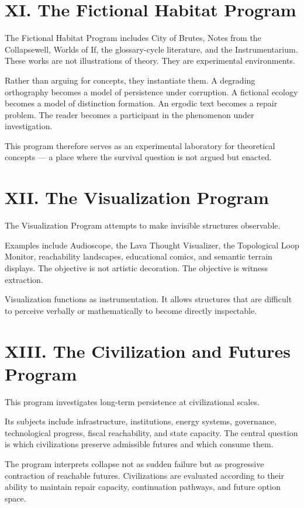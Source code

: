 \documentclass[12pt, openany]{book}
\begin{document}
\section{XI. The Fictional Habitat Program}

The Fictional Habitat Program includes City of Brutes, Notes from the
Collapsewell, Worlds of If, the glossary-cycle literature, and the
Instrumentarium. These works are not illustrations of theory. They are
experimental environments.

Rather than arguing for concepts, they instantiate them. A degrading
orthography becomes a model of persistence under corruption. A fictional
ecology becomes a model of distinction formation. An ergodic text becomes a
repair problem. The reader becomes a participant in the phenomenon under
investigation.

This program therefore serves as an experimental laboratory for theoretical
concepts — a place where the survival question is not argued but enacted.

\section{XII. The Visualization Program}

The Visualization Program attempts to make invisible structures observable.

Examples include Audioscope, the Lava Thought Visualizer, the Topological
Loop Monitor, reachability landscapes, educational comics, and semantic
terrain displays. The objective is not artistic decoration. The objective is
witness extraction.

Visualization functions as instrumentation. It allows structures that are
difficult to perceive verbally or mathematically to become directly
inspectable.

\section{XIII. The Civilization and Futures Program}

This program investigates long-term persistence at civilizational scales.

Its subjects include infrastructure, institutions, energy systems, governance,
technological progress, fiscal reachability, and state capacity. The central
question is which civilizations preserve admissible futures and which consume
them.

The program interprets collapse not as sudden failure but as progressive
contraction of reachable futures. Civilizations are evaluated according to
their ability to maintain repair capacity, continuation pathways, and future
option space.
\end{document}
